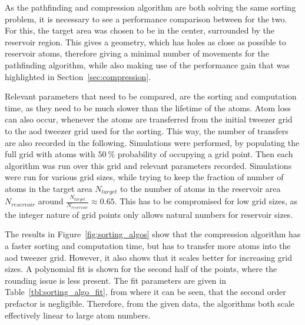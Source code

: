As the pathfinding and compression algorithm are both solving the same sorting problem, it is necessary to see a performance comparison between for the two. For this, the target area was chosen to be in the center, surrounded by the reservoir region. This gives a geometry, which has holes as close as possible to reservoir atoms, therefore giving a minimal number of movements for the pathfinding algorithm, while also making use of the performance gain that was highlighted in Section~\ref{sec:compression}.

Relevant parameters that need to be compared, are the sorting and computation time, as they need to be much slower than the lifetime of the atoms. Atom loss can also occur, whenever the atoms are transferred from the initial tweezer grid to the \ac{aod} tweezer grid used for the sorting. This way, the number of transfers are also recorded in the following.
Simulations were performed, by populating the full grid with atoms with $\SI{50}{\percent}$ probability of occupying a grid point. Then each algorithm was run over this grid and relevant parameters recorded. Simulations were run for various grid sizes, while trying to keep the fraction of number of atoms in the target area $N_{target}$ to the number of atoms in the reservoir area $N_{reservoir}$ around $\frac{N_{target}}{N_{reservoir}} \approx 0.65$. This has to be compromised for low grid sizes, as the integer nature of grid points only allows natural numbers for reservoir sizes.

The results in Figure~\ref{fig:sorting_algos} show that the compression algorithm has a faster sorting and computation time, but has to transfer more atoms into the \ac{aod} tweezer grid. However, it also shows that it scales better for increasing grid sizes. A polynomial fit is shown for the second half of the points, where the rounding issue is less present. The fit parameters are given in Table~\ref{tbl:sorting_algo_fit}, from where it can be seen, that the second order prefactor is negligible. Therefore, from the given data, the algorithms both scale effectively linear to large atom numbers.

